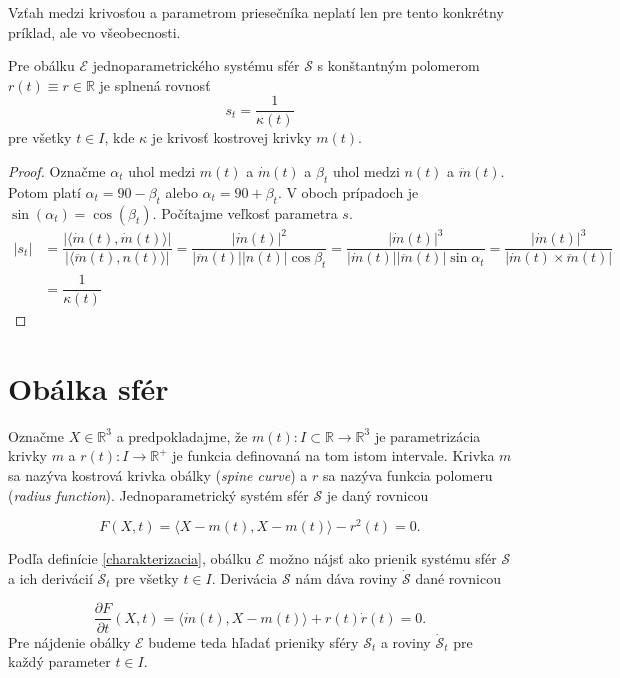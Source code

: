 Vzťah medzi krivosťou a parametrom priesečníka neplatí len pre tento konkrétny príklad, ale vo všeobecnosti.

\begin{lemma}
Pre obálku $\mathcal{E}$ jednoparametrického systému sfér $\mathcal{S}$ s konštantným polomerom $r(t) \equiv r \in \mathbb{R}$ je splnená rovnosť 
$$ s_t = \dfrac{1}{\kappa(t)} $$
pre všetky $t \in I$, kde $\kappa$ je krivosť kostrovej krivky $m(t).$
\end{lemma}

\begin{proof}
Označme $\alpha_t $ uhol medzi $m(t)$ a $\dot{m}(t)$ a $\beta_t $ uhol medzi $n(t)$ a $\ddot{m}(t)$. Potom platí $\alpha_t = 90 - \beta_t$ alebo $\alpha_t = 90 + \beta_t$. V oboch prípadoch je $\sin (\alpha_t) = \cos (\beta_t).$ Počítajme veľkosť parametra $s.$
\begin{align*}
|s_t| &= \dfrac{| \langle \dot{m}(t), \dot{m}(t) \rangle |}{ |\langle \ddot{m}(t), n(t) \rangle |} = \dfrac{| \dot{m}(t) |^2}{| \ddot{m}(t) | | n(t) | \cos \beta_t } = \dfrac{| \dot{m}(t) |^3}{| \dot{m}(t) | | \ddot{m}(t) | \sin \alpha_t } = \dfrac{| \dot{m}(t) |^3}{ | \dot{m}(t) \times \ddot{m}(t) | } \\
&= \dfrac{1}{\kappa (t)}
\end{align*} 
\end{proof}

\section{Obálka sfér}
Označme $X \in \mathbb{R}^3$ a predpokladajme, že $m(t) \colon I \subset \mathbb{R} \rightarrow \mathbb{R}^3$ je parametrizácia krivky $m$ a $r(t) \colon I \rightarrow \mathbb{R}^{+}$ je funkcia definovaná na tom istom intervale. Krivka $m$ sa nazýva kostrová krivka obálky (\textit{spine curve}) a $r$ sa nazýva funkcia polomeru (\textit{radius function}). Jednoparametrický systém sfér $\mathcal{S}$ je daný rovnicou

$$
F(X, t) = \langle X - m(t), X - m(t) \rangle - r^2(t)= 0.
$$

Podľa definície \ref{charakterizacia}, obálku $\mathcal{E}$ možno nájsť ako prienik systému sfér $\mathcal{S}$ a ich derivácií $\mathcal{\dot{S}}_t$ pre všetky $t \in I$. Derivácia $\mathcal{S}$ nám dáva roviny $\mathcal{\dot{S}}$ dané rovnicou

$$
\dfrac{\partial F}{\partial t} (X, t) = \langle \dot{m}(t), X - m(t) \rangle + r(t) \dot{r}(t) = 0.
$$
Pre nájdenie obálky $\mathcal{E}$ budeme teda hľadať prieniky sféry $\mathcal{S}_t$ a roviny $\mathcal{\dot{S}}_t $ pre každý parameter $t \in I$.


